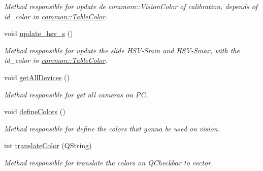 \begin{DoxyCompactItemize}
\begin{DoxyCompactList}\small\item\em Method responsible for update de commom\+::\+Vision\+Color of calibration, depends of id\+\_\+color in \hyperlink{structcommon_1_1TableColor}{common\+::\+Table\+Color}. \end{DoxyCompactList}\item 
void \hyperlink{classMainWindow_a6a418df110068fb09bd60ce785c05926}{update\+\_\+hsv\+\_\+s} ()\hypertarget{classMainWindow_a6a418df110068fb09bd60ce785c05926}{}\label{classMainWindow_a6a418df110068fb09bd60ce785c05926}

\begin{DoxyCompactList}\small\item\em Method responsible for update the slide H\+S\+V-\/\+Smin and H\+S\+V-\/\+Smax, with the id\+\_\+color in \hyperlink{structcommon_1_1TableColor}{common\+::\+Table\+Color}. \end{DoxyCompactList}\item 
void \hyperlink{classMainWindow_a0ec10b5c5cd98c5aa086bf91793c9d7e}{get\+All\+Devices} ()
\begin{DoxyCompactList}\small\item\em Method responsible for get all cameras on PC. \end{DoxyCompactList}\item 
void \hyperlink{classMainWindow_a62c1577587f33bc89c823d3ea3f23bda}{define\+Colors} ()\hypertarget{classMainWindow_a62c1577587f33bc89c823d3ea3f23bda}{}\label{classMainWindow_a62c1577587f33bc89c823d3ea3f23bda}

\begin{DoxyCompactList}\small\item\em Method responsible for define the colors that gonna be used on vision. \end{DoxyCompactList}\item 
int \hyperlink{classMainWindow_a7d8385cfb0a4a1bbb38ac943010962d9}{translate\+Color} (Q\+String)\hypertarget{classMainWindow_a7d8385cfb0a4a1bbb38ac943010962d9}{}\label{classMainWindow_a7d8385cfb0a4a1bbb38ac943010962d9}

\begin{DoxyCompactList}\small\item\em Method responsible for translate the colors on Q\+Checkbox to vector. \end{DoxyCompactList}\end{DoxyCompactItemize}
